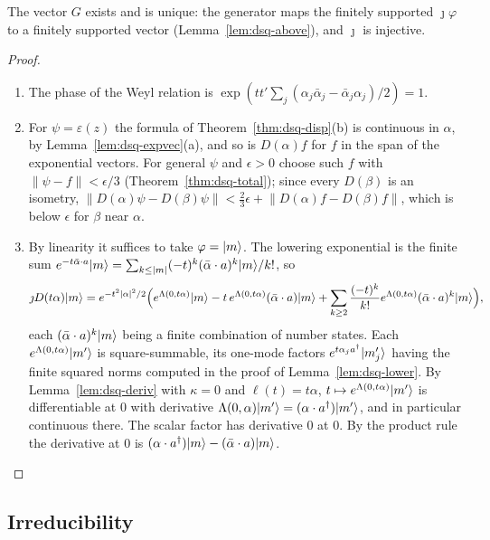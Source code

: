 \begin{veteenv}
The vector $G$ exists and is unique: the generator maps the finitely supported $\jmath\varphi$ to a finitely supported vector
(Lemma~\ref{lem:dsq-above}), and $\jmath$ is injective.

\begin{proof}
\begin{enumerate}
\item[(a)] The phase of the Weyl relation is $\exp(tt'\sum_j(\alpha_j\bar\alpha_j-\bar\alpha_j\alpha_j)/2)=1$.
\item[(b)] For $\psi=\varepsilon(z)$ the formula of Theorem~\ref{thm:dsq-disp}(b) is continuous in $\alpha$, by
Lemma~\ref{lem:dsq-expvec}(a), and so is $D(\alpha)f$ for $f$ in the span of the exponential vectors. For general $\psi$ and
$\epsilon>0$ choose such $f$ with $\lVert\psi-f\rVert<\epsilon/3$ (Theorem~\ref{thm:dsq-total}); since every $D(\beta)$ is an
isometry, $\lVert D(\alpha)\psi-D(\beta)\psi\rVert<\frac23\epsilon+\lVert D(\alpha)f-D(\beta)f\rVert$, which is below
$\epsilon$ for $\beta$ near $\alpha$.
\item[(c)] By linearity it suffices to take $\varphi=\lvert m\rangle$. The lowering exponential is the finite sum
$e^{-t\bar\alpha\cdot a}\lvert m\rangle=\sum_{k\le\lvert m\rvert}(-t)^k(\bar\alpha\cdot a)^k\lvert m\rangle/k!$, so
\[
 \jmath D(t\alpha)\lvert m\rangle=e^{-t^2\lvert\alpha\rvert^2/2}\Bigl(e^{\Lambda(0,t\alpha)}\lvert m\rangle-t\,e^{\Lambda(0,t\alpha)}(\bar\alpha\cdot a)\lvert m\rangle
 +\sum_{k\ge2}\frac{(-t)^k}{k!}e^{\Lambda(0,t\alpha)}(\bar\alpha\cdot a)^k\lvert m\rangle\Bigr),
\]
each $(\bar\alpha\cdot a)^k\lvert m\rangle$ being a finite combination of number states. Each $e^{\Lambda(0,t\alpha)}\lvert m'\rangle$ is
square-summable, its one-mode factors $e^{t\alpha_ja^\dagger}\lvert m'_j\rangle$ having the finite squared norms computed in the proof of
Lemma~\ref{lem:dsq-lower}. By Lemma~\ref{lem:dsq-deriv} with $\kappa=0$ and $\ell(t)=t\alpha$, $t\mapsto
e^{\Lambda(0,t\alpha)}\lvert m'\rangle$ is differentiable at $0$ with derivative $\Lambda(0,\alpha)\lvert m'\rangle=(\alpha\cdot a^\dagger)\lvert m'\rangle$,
and in particular continuous there. The scalar factor has derivative $0$ at $0$. By the product rule the derivative at $0$
is $(\alpha\cdot a^\dagger)\lvert m\rangle-(\bar\alpha\cdot a)\lvert m\rangle$.\qedhere
\end{enumerate}
\end{proof}

\subsection{Irreducibility}\label{sec:dsq-irr}


\end{veteenv}

